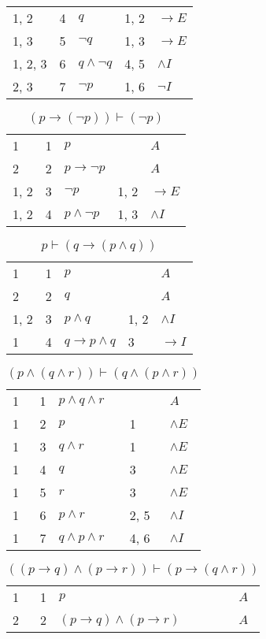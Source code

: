 \documentclass{article}
\begin{document}
\begin{table}[htbp]
\begin{tabular}{lrlll}
{1, 2} & 4 & $q$ & {1, 2} & $→E$ \\
{1, 3} & 5 & $¬q$ & {1, 3} & $→E$ \\
{1, 2, 3} & 6 & $q∧ ¬q$ & {4, 5} & $∧I$ \\
{2, 3} & 7 & $¬p$ & {1, 6} & $¬I$ \\
\end{tabular}
\end{table}\begin{table}[htbp]\caption*{$(p→(¬p)) ⊢ (¬p)$}\centering\begin{tabular}{lrlll}
{1} & 1 & $p$ & {} & $A$ \\
{2} & 2 & $p→ ¬p$ & {} & $A$ \\
{1, 2} & 3 & $¬p$ & {1, 2} & $→E$ \\
{1, 2} & 4 & $p∧ ¬p$ & {1, 3} & $∧I$ \\
\end{tabular}
\end{table}\begin{table}[htbp]\caption*{$p ⊢ (q→(p∧q))$}\centering\begin{tabular}{lrlll}
{1} & 1 & $p$ & {} & $A$ \\
{2} & 2 & $q$ & {} & $A$ \\
{1, 2} & 3 & $p∧q$ & {1, 2} & $∧I$ \\
{1} & 4 & $q→p∧q$ & {3} & $→I$ \\
\end{tabular}
\end{table}\begin{table}[htbp]\caption*{$(p∧(q∧r)) ⊢ (q∧(p∧r))$}\centering\begin{tabular}{lrlll}
{1} & 1 & $p∧q∧r$ & {} & $A$ \\
{1} & 2 & $p$ & {1} & $∧E$ \\
{1} & 3 & $q∧r$ & {1} & $∧E$ \\
{1} & 4 & $q$ & {3} & $∧E$ \\
{1} & 5 & $r$ & {3} & $∧E$ \\
{1} & 6 & $p∧r$ & {2, 5} & $∧I$ \\
{1} & 7 & $q∧p∧r$ & {4, 6} & $∧I$ \\
\end{tabular}
\end{table}\begin{table}[htbp]\caption*{$((p→q)∧(p→r)) ⊢ (p→(q∧r))$}\centering\begin{tabular}{lrlll}
{1} & 1 & $p$ & {} & $A$ \\
{2} & 2 & $(p→q)∧(p→r)$ & {} & $A$ \\

\end{tabular}
\end{table}
\end{document}
